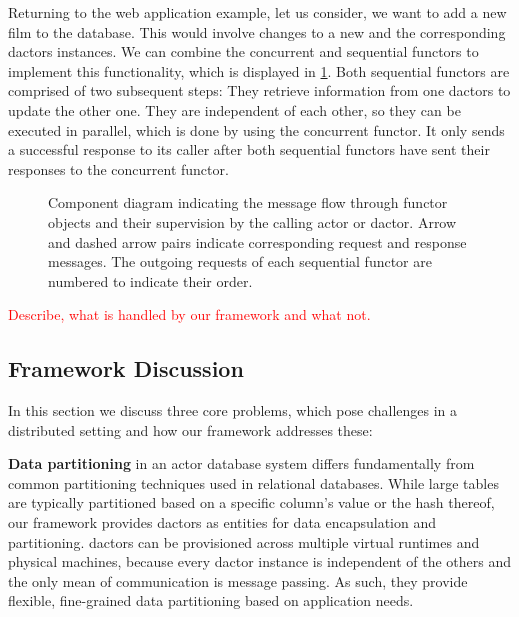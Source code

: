     Returning to the web application example, let us consider, we want to add a new film to the database.
    This would involve changes to a new  and the corresponding  \glspl{dactor} instances.
    We can combine the concurrent and sequential \glspl{functor} to implement this functionality, which is displayed in \cref{fig:functor_diagram}.
    Both sequential \glspl{functor} are comprised of two subsequent steps:
    They retrieve information from one \glspl{dactor} to update the other one.
    They are independent of each other, so they can be executed in parallel, which is done by using the concurrent \gls{functor}.
    It only sends a successful response to its caller after both sequential \glspl{functor} have sent their responses to the concurrent \gls{functor}.
    
    \begin{figure}
      \centering
      
      \caption{Component diagram indicating the message flow through \gls{functor} objects and their supervision by the calling actor or \gls{dactor}. Arrow and dashed arrow pairs indicate corresponding request and response messages. The outgoing requests of each sequential \gls{functor} are numbered to indicate their order.}
      \label{fig:functor_diagram}
    \end{figure}

    \textcolor{red}{Describe, what is handled by our framework and what not.}

  \subsection{Framework Discussion}\label{subsec:framework_discussion}
    In this section we discuss three core problems, which pose challenges in a distributed setting and how our framework addresses these:
    
    \textbf{Data partitioning} in an actor database system differs fundamentally from common partitioning techniques used in relational databases.
    While large tables are typically partitioned based on a specific column's value or the hash thereof, our framework provides \glspl{dactor} as entities for data encapsulation and partitioning.
    \Glspl{dactor} can be provisioned across multiple virtual runtimes and physical machines, because every \gls{dactor} instance is independent of the others and the only mean of communication is message passing.
    As such, they provide flexible, fine-grained data partitioning based on application needs.
    
